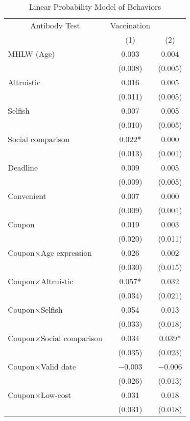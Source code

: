 \begin{table}

\caption{Linear Probability Model of Behaviors \label{tab:act-reg}}
\centering
\fontsize{9}{11}\selectfont
\begin{threeparttable}
\begin{tabular}[t]{lcc}
\toprule
\multicolumn{1}{c}{Antibody Test} & \multicolumn{1}{c}{Vaccination} \\
\cmidrule(l{3pt}r{3pt}){1-1} \cmidrule(l{3pt}r{3pt}){2-2}
  & (1) & (2)\\
\midrule
MHLW (Age) & \num{0.003} & \num{0.004}\\
 & (\num{0.008}) & (\num{0.005})\\
Altruistic & \num{0.016} & \num{0.005}\\
 & (\num{0.011}) & (\num{0.005})\\
Selfish & \num{0.007} & \num{0.005}\\
 & (\num{0.010}) & (\num{0.005})\\
Social comparison & \num{0.022}* & \num{0.000}\\
 & (\num{0.013}) & (\num{0.001})\\
Deadline & \num{0.009} & \num{0.005}\\
 & (\num{0.009}) & (\num{0.005})\\
Convenient & \num{0.007} & \num{0.000}\\
 & (\num{0.009}) & (\num{0.001})\\
Coupon & \num{0.019} & \num{0.003}\\
 & (\num{0.020}) & (\num{0.011})\\
Coupon×Age expression & \num{0.026} & \num{0.002}\\
 & (\num{0.030}) & (\num{0.015})\\
Coupon×Altruistic & \num{0.057}* & \num{0.032}\\
 & (\num{0.034}) & (\num{0.021})\\
Coupon×Selfish & \num{0.054} & \num{0.013}\\
 & (\num{0.033}) & (\num{0.018})\\
Coupon×Social comparison & \num{0.034} & \num{0.039}*\\
 & (\num{0.035}) & (\num{0.023})\\
Coupon×Valid date & \num{-0.003} & \num{-0.006}\\
 & (\num{0.026}) & (\num{0.013})\\
Coupon×Low-cost & \num{0.031} & \num{0.018}\\
 & (\num{0.031}) & (\num{0.018})\\

\end{tabular}
\end{threeparttable}
\end{table}
